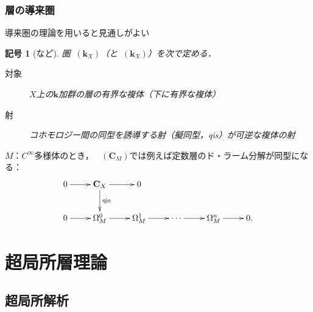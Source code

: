 \documentclass[dvipdfmx,10pt,aspectratio=169,leqno]{beamer}%
\newcommand{\cc}{\mathbf{C}}
\newcommand{\kk}{\mathbf{k}}
\newcommand{\mcal}{\mathcal}
\newcommand{\Ab}{{\mathsf{Ab}}}
\numberwithin{equation}{subsection}
\newcommand{\cO}{\mcal{O}}
\newcommand{\Dompl}{\mathop{\mathsf{D}^\mathrm{+}}\nolimits}
\newcommand{\Dompb}{\mathop{\mathsf{D}^\mathrm{b}}\nolimits}
\newcommand{\RG}{\mathop{\mathrm{R}\hspace{-0pt}\Gamma}\nolimits}
\newcommand{\Rder}[1][]{\mathop{\mathrm{R}^{#1}\hspace{-2pt}}\nolimits}
\newcommand{\Sh}{\mathrm{Sh}}
\newcommand{\blk}{\mathord{\ \cdot\ }}
\theoremstyle{mystyle}
\newtheorem{NTN}[AXM]{記号}
\begin{document}

\begin{frame}
  \frametitle{層の導来圏}
  導来圏の理論を用いると見通しがよい
  \begin{NTN}[{\cite{KS90}など}]
    圏\(\Dompb(\kk_X)\)（と\(\Dompl(\kk_X)\)）を次で定める．
    \begin{description}
      \item[対象] \(X\)上の\(\kk\)加群の層の有界な複体（下に有界な複体）
      \item[射] コホモロジー間の同型を誘導する射（擬同型，qis）が可逆な複体の射
    \end{description}
  \end{NTN}\pause
  \(M\)：\(C^{\infty}\)多様体のとき，
  \(\Dompb(\cc_M)\)では例えば定数層のド・ラーム分解が同型になる：
  \[\vcenter{\xymatrix{
    0\ar[r]&
    \cc_X \ar[r] \ar[d]^-{\mathrm{qis}}&
    0\\
    0\ar[r]&
    \Omega_M^0\ar[r]&
    \Omega_M^1\ar[r]&
    \cdots\ar[r]&
    \Omega_M^n\ar[r]&0.
  }}\]
\end{frame}
\section{超局所層理論}
\subsection{超局所解析}
\end{document}

